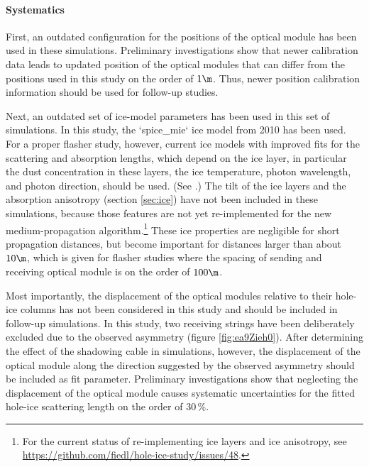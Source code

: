 \paragraph{Systematics}
First, an outdated configuration for the positions of the optical module has been used in these simulations. Preliminary investigations show that newer calibration data leads to updated position of the optical modules that can differ from the positions used in this study on the order of $1\m$. Thus, newer position calibration information should be used for follow-up studies.

Next, an outdated set of ice-model parameters has been used in this set of simulations. In this study, the `spice_mie` ice model from 2010 has been used. For a proper flasher study, however, current ice models with improved fits for the scattering and absorption lengths, which depend on the ice layer, in particular the dust concentration in these layers, the ice temperature, photon wavelength, and photon direction, should be used. (See \cite{icepaper,flasherdataderivedicemodels}.)
The tilt of the ice layers and the absorption anisotropy (section \ref{sec:ice}) have not been included in these simulations, because those features are not yet re-implemented for the new medium-propagation algorithm.\footnote{For the current status of re-implementing ice layers and ice anisotropy, see \url{https://github.com/fiedl/hole-ice-study/issues/48}.} These ice properties are negligible for short propagation distances, but become important for distances larger than about $10\m$, which is given for flasher studies where the spacing of sending and receiving optical module is on the order of $100\m$.

Most importantly, the displacement of the optical modules relative to their hole-ice columns has not been considered in this study and should be included in follow-up simulations. In this study, two receiving strings have been deliberately excluded due to the observed asymmetry (figure \ref{fig:ea9Zieh0}). After determining the effect of the shadowing cable in simulations, however, the displacement of the optical module along the direction suggested by the observed asymmetry should be included as fit parameter. Preliminary investigations show that neglecting the displacement of the optical module causes systematic uncertainties for the fitted hole-ice scattering length on the order of $30\,\%$.


